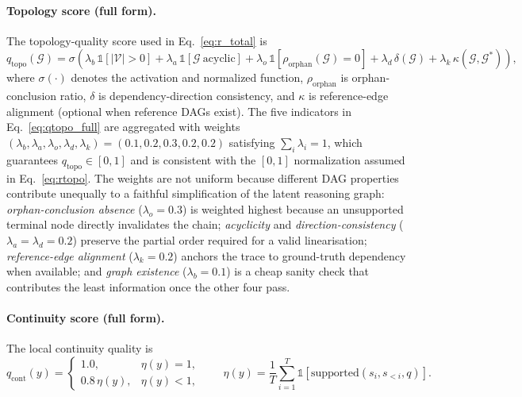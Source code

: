 \paragraph{Topology score (full form).}
The topology-quality score used in Eq.~\ref{eq:r_total} is
\begin{equation}
\label{eq:qtopo_full}
q_{\mathrm{topo}}(\mathcal{G}) =\sigma(
\lambda_b\,\mathbb{1}[|\mathcal{V}|>0]
+\lambda_a\,\mathbb{1}[\mathcal{G}\ \text{acyclic}]
+\lambda_o\,\mathbb{1}[\rho_{\mathrm{orphan}}(\mathcal{G})=0]
+\lambda_d\,\delta(\mathcal{G})
+\lambda_k\,\kappa(\mathcal{G},\mathcal{G}^{*})),
\end{equation}
where $\sigma(\cdot)$ denotes the activation and normalized function, $\rho_{\mathrm{orphan}}$ is orphan-conclusion ratio, $\delta$ is dependency-direction consistency, and $\kappa$ is reference-edge alignment (optional when reference DAGs exist). The five indicators in Eq.~\eqref{eq:qtopo_full} are aggregated with weights
$(\lambda_b,\lambda_a,\lambda_o,\lambda_d,\lambda_k){=}(0.1,0.2,0.3,0.2,0.2)$
satisfying $\sum_i \lambda_i {=} 1$, which guarantees $q_{\mathrm{topo}}\!\in\![0,1]$ and is consistent with the $[0,1]$ normalization assumed in Eq.~\eqref{eq:rtopo}. The weights are not uniform because different DAG properties contribute unequally to a faithful simplification of the latent reasoning graph: \emph{orphan-conclusion absence} ($\lambda_o{=}0.3$) is weighted highest because an unsupported terminal node directly invalidates the chain; \emph{acyclicity} and \emph{direction-consistency} ($\lambda_a{=}\lambda_d{=}0.2$) preserve the partial order required for a valid linearisation; \emph{reference-edge alignment} ($\lambda_k{=}0.2$) anchors the trace to ground-truth dependency when available; and \emph{graph existence} ($\lambda_b{=}0.1$) is a cheap sanity check that contributes the least information once the other four pass.

\paragraph{Continuity score (full form).}
The local continuity quality is
\begin{equation}
\label{eq:qcont_full}
q_{\mathrm{cont}}(y)=
\begin{cases}
1.0, & \eta(y)=1,\\
0.8\,\eta(y), & \eta(y)<1,
\end{cases}
\qquad
\eta(y)=\frac{1}{T}\sum_{i=1}^{T}\mathbb{1}[\mathrm{supported}(s_i,s_{<i},q)].
\end{equation}

